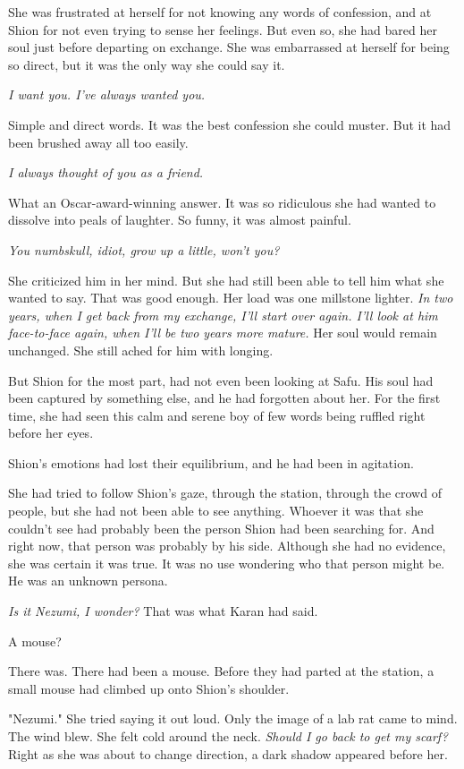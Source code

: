 She was frustrated at herself for not knowing any words of confession,
and at Shion for not even trying to sense her feelings. But even so, she
had bared her soul just before departing on exchange. She was
embarrassed at herself for being so direct, but it was the only way she
could say it.

\emph{I want you. I've always wanted you.}

Simple and direct words. It was the best confession she could muster.
But it had been brushed away all too easily.

\emph{I always thought of you as a friend.}

What an Oscar-award-winning answer. It was so ridiculous she had wanted
to dissolve into peals of laughter. So funny, it was almost painful.

\emph{You numbskull, idiot, grow up a little, won't you?}

She criticized him in her mind. But she had still been able to tell him
what she wanted to say. That was good enough. Her load was one millstone
lighter. \emph{In two years, when I get back from my exchange, I'll start over
again. I'll look at him face-to-face again, when I'll be two years more
mature.} Her soul would remain unchanged. She still ached for him with
longing.

But Shion for the most part, had not even been looking at Safu. His soul
had been captured by something else, and he had forgotten about her. For
the first time, she had seen this calm and serene boy of few words being
ruffled right before her eyes.

Shion's emotions had lost their equilibrium, and he had been in
agitation.

She had tried to follow Shion's gaze, through the station, through the
crowd of people, but she had not been able to see anything. Whoever it
was that she couldn't see had probably been the person Shion had been
searching for. And right now, that person was probably by his side.
Although she had no evidence, she was certain it was true. It was no use
wondering who that person might be. He was an unknown persona.

\emph{Is it Nezumi, I wonder?} That was what Karan had said.

A mouse?

There was. There had been a mouse. Before they had parted at the
station, a small mouse had climbed up onto Shion's shoulder.

"Nezumi." She tried saying it out loud. Only the image of a lab rat came
to mind. The wind blew. She felt cold around the neck. \emph{Should I go back
to get my scarf?} Right as she was about to change direction, a dark
shadow appeared before her.


